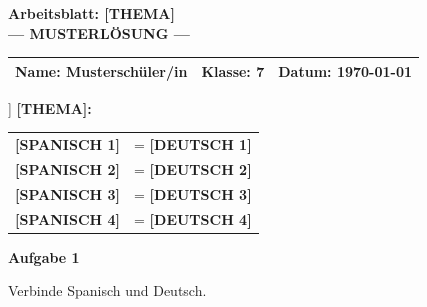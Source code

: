 \documentclass[11pt, a4paper]{article}
\newcommand{\fachfarbe}{spanisch}
\newcommand{\thema}{[THEMA]}
\newcommand{\klasse}{7}
\newcommand{\datum}{\today}
\newcommand{\punktebox}[1]{\hfill\fbox{\small \_/#1}}
\newcommand{\loesung}[1]{\textcolor{loesung}{\textbf{#1}}}
\newenvironment{aufgabe}[1]{%
    \needspace{5\baselineskip}%
    \nopagebreak[4]%
    \vspace{10pt}
    \noindent\textbf{\textcolor{\fachfarbe}{Aufgabe #1}}
    \nopagebreak[4]%
    \vspace{5pt}
    \nopagebreak[4]%
    \begin{list}{}{\leftmargin=0pt}
    \item[]
}{%
    \end{list}
}
\newcommand{\es}[1]{\textcolor{\fachfarbe}{\textbf{#1}}}
\begin{document}

\begin{center}
    {\Large\bfseries\textcolor{\fachfarbe}{Arbeitsblatt: \thema}}\\[0.3em]
    {\large\textcolor{loesung}{\textbf{--- MUSTERLÖSUNG ---}}}
\end{center}

\vspace{5pt}

\noindent
\begin{tabularx}{\textwidth}{|X|X|X|}
\hline
\textbf{Name:} \textcolor{loesung}{Musterschüler/in} &
\textbf{Klasse:} \klasse &
\textbf{Datum:} \datum \\
\hline
\end{tabularx}

\vspace{15pt}


\begin{merkkasten}[Merkkasten: [TITEL]]
\textbf{[THEMA]:}

\vspace{0.5em}

\begin{tabular}{ll}
\es{[SPANISCH 1]} & = \loesung{[DEUTSCH 1]} \\[0.8em]
\es{[SPANISCH 2]} & = \loesung{[DEUTSCH 2]} \\[0.8em]
\es{[SPANISCH 3]} & = \loesung{[DEUTSCH 3]} \\[0.8em]
\es{[SPANISCH 4]} & = \loesung{[DEUTSCH 4]} \\
\end{tabular}

\end{merkkasten}

\vspace{10pt}


\begin{aufgabe}{1}
Verbinde Spanisch und Deutsch. \punktebox{4}
\end{aufgabe}
\end{document}
